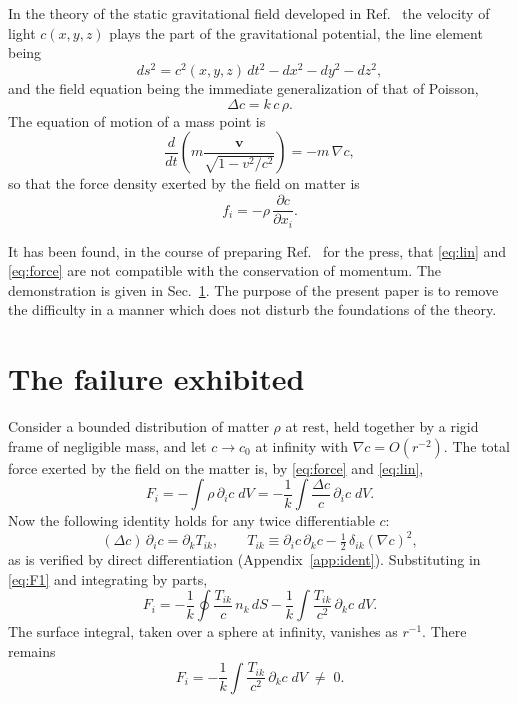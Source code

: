 \documentclass[aps,prd,reprint,amsmath,amssymb,nofootinbib,longbibliography]{revtex4-2}
\begin{document}
In the theory of the static gravitational field developed in Ref.~\cite{ein1912a} the velocity of
light $c(x,y,z)$ plays the part of the gravitational potential, the line element being
\begin{equation}
ds^{2} = c^{2}(x,y,z)\,dt^{2} - dx^{2} - dy^{2} - dz^{2} ,
\label{eq:ds}
\end{equation}
and the field equation being the immediate generalization of that of Poisson,
\begin{equation}
\Delta c = k\,c\,\rho .
\label{eq:lin}
\end{equation}
The equation of motion of a mass point is
\begin{equation}
\frac{d}{dt}\!\left( m \frac{\bm v}{\sqrt{1-v^{2}/c^{2}}} \right) = - m\, \nabla c ,
\end{equation}
so that the force density exerted by the field on matter is
\begin{equation}
f_i = - \rho\, \frac{\partial c}{\partial x_i} .
\label{eq:force}
\end{equation}

It has been found, in the course of preparing Ref.~\cite{ein1912a} for the press, that
\eqref{eq:lin} and \eqref{eq:force} are not compatible with the conservation of momentum. The
demonstration is given in Sec.~\ref{sec:fail}. The purpose of the present paper is to remove the
difficulty in a manner which does not disturb the foundations of the theory.

\section{The failure exhibited}
\label{sec:fail}

Consider a bounded distribution of matter $\rho$ at rest, held together by a rigid frame of
negligible mass, and let $c \to c_0$ at infinity with $\nabla c = O(r^{-2})$. The total force
exerted by the field on the matter is, by \eqref{eq:force} and \eqref{eq:lin},
\begin{equation}
F_i = -\int \rho\, \partial_i c \; dV
    = -\frac{1}{k}\int \frac{\Delta c}{c}\, \partial_i c \; dV .
\label{eq:F1}
\end{equation}
Now the following identity holds for any twice differentiable $c$:
\begin{equation}
(\Delta c)\,\partial_i c = \partial_k T_{ik} , \qquad
T_{ik} \equiv \partial_i c\, \partial_k c - \tfrac{1}{2}\,\delta_{ik} (\nabla c)^{2} ,
\label{eq:ident}
\end{equation}
as is verified by direct differentiation (Appendix~\ref{app:ident}). Substituting in \eqref{eq:F1}
and integrating by parts,
\begin{equation}
F_i = -\frac{1}{k}\oint \frac{T_{ik}}{c}\, n_k \, dS
      - \frac{1}{k}\int \frac{T_{ik}}{c^{2}}\, \partial_k c \; dV .
\label{eq:F2}
\end{equation}
The surface integral, taken over a sphere at infinity, vanishes as $r^{-1}$. There remains
\begin{equation}
\boxed{\;
F_i = - \frac{1}{k}\int \frac{T_{ik}}{c^{2}}\, \partial_k c \; dV \;\neq\; 0 .
\;}
\label{eq:anom}
\end{equation}
\end{document}
